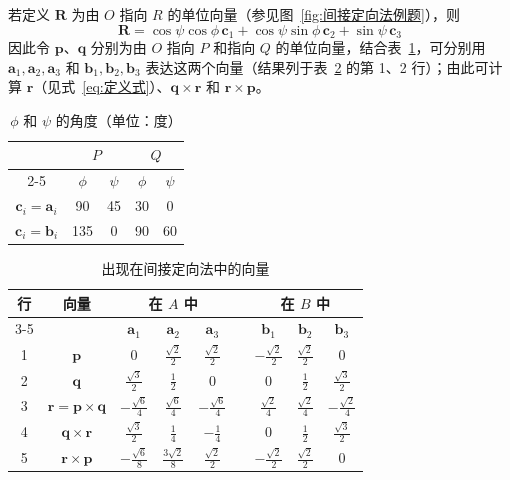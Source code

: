 \begin{solution}
若定义 $\mathbf{R}$ 为由 $O$ 指向 $R$ 的单位向量（参见图~\eqref{fig:间接定向法例题}），则
$$
\mathbf{R}=\cos\psi\cos\phi\,\mathbf{c}_1+\cos\psi\sin\phi\,\mathbf{c}_2+\sin\psi\,\mathbf{c}_3
$$
因此令 $\mathbf{p}$、$\mathbf{q}$ 分别为由 $O$ 指向 $P$ 和指向 $Q$ 的单位向量，结合表~\ref{tab:1.5.1}，可分别用 $\mathbf{a}_1,\mathbf{a}_2,\mathbf{a}_3$ 和 $\mathbf{b}_1,\mathbf{b}_2,\mathbf{b}_3$ 表达这两个向量（结果列于表~\ref{tab:1.5.2} 的第 1、2 行）；由此可计算 $\mathbf{r}$（见式~\eqref{eq:定义式}）、$\mathbf{q}\times\mathbf{r}$ 和 $\mathbf{r}\times\mathbf{p}$。

\begin{table}[htbp]
\centering
\caption{$\phi$ 和 $\psi$ 的角度（单位：度）}
\label{tab:1.5.1}
\begin{tabular}{|c|cc|cc|}
\hline
 & \multicolumn{2}{c|}{$P$} & \multicolumn{2}{c|}{$Q$} \\
\cline{2-5}
 & $\phi$ & $\psi$ & $\phi$ & $\psi$ \\
\hline
$\mathbf{c}_i = \mathbf{a}_i$ & 90 & 45 & 30  & 0  \\
$\mathbf{c}_i = \mathbf{b}_i$ & 135 & 0  & 90  & 60 \\
\hline
\end{tabular}
\end{table}

\begin{table}[htbp]
\centering
\caption{出现在间接定向法中的向量}
\label{tab:1.5.2}
\begin{tabular}{|c|c|c|c|c|c|c|c|c|}
\hline
\multirow{2}{*}{行} & \multirow{2}{*}{向量} & \multicolumn{3}{c|}{在 $A$ 中} & & \multicolumn{3}{c|}{在 $B$ 中} \\
\cline{3-5}\cline{7-9}
 & & $\mathbf{a}_1$ & $\mathbf{a}_2$ & $\mathbf{a}_3$ & & $\mathbf{b}_1$ & $\mathbf{b}_2$ & $\mathbf{b}_3$ \\
\hline
1 & $\mathbf{p}$ & $0$ & $\frac{\sqrt{2}}{2}$ & $\frac{\sqrt{2}}{2}$ & & $-\frac{\sqrt{2}}{2}$ & $\frac{\sqrt{2}}{2}$ & $0$ \\
2 & $\mathbf{q}$ & $\frac{\sqrt{3}}{2}$ & $\frac{1}{2}$ & $0$ & & $0$ & $\frac{1}{2}$ & $\frac{\sqrt{3}}{2}$ \\
3 & $\mathbf{r}=\mathbf{p}\times\mathbf{q}$ & $-\frac{\sqrt{6}}{4}$ & $\frac{\sqrt{6}}{4}$ & $-\frac{\sqrt{6}}{4}$ & & $\frac{\sqrt{2}}{4}$ & $\frac{\sqrt{2}}{4}$ & $-\frac{\sqrt{2}}{4}$ \\
4 & $\mathbf{q}\times\mathbf{r}$ & $\frac{\sqrt{3}}{2}$ & $\frac{1}{4}$ & $-\frac{1}{4}$ & & $0$ & $\frac{1}{2}$ & $\frac{\sqrt{3}}{2}$ \\
5 & $\mathbf{r}\times\mathbf{p}$ & $-\frac{\sqrt{6}}{8}$ & $\frac{3\sqrt{2}}{8}$ & $\frac{\sqrt{2}}{2}$ & & $-\frac{\sqrt{2}}{2}$ & $\frac{\sqrt{2}}{2}$ & $0$ \\
\hline
\end{tabular}
\end{table}


\end{solution}

